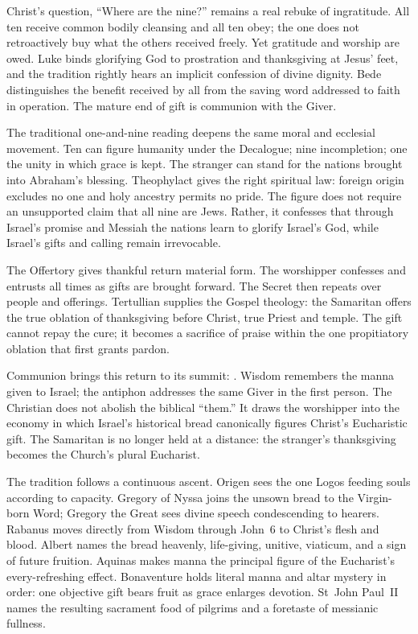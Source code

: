 Christ's question, ``Where are the nine?'' remains a real rebuke of
ingratitude. All ten receive common bodily cleansing and all ten obey; the one
does not retroactively buy what the others received freely. Yet gratitude and
worship are owed. Luke binds glorifying God to prostration and thanksgiving at
Jesus' feet, and the tradition rightly hears an implicit confession of divine
dignity. Bede distinguishes the benefit received by all from the saving word
addressed to faith in operation. The mature end of gift is communion with the
Giver.

The traditional one-and-nine reading deepens the same moral and ecclesial
movement. Ten can figure humanity under the Decalogue; nine incompletion; one
the unity in which grace is kept. The stranger can stand for the nations
brought into Abraham's blessing. Theophylact gives the right spiritual law:
foreign origin excludes no one and holy ancestry permits no pride. The figure
does not require an unsupported claim that all nine are Jews. Rather, it
confesses that through Israel's promise and Messiah the nations learn to
glorify Israel's God, while Israel's gifts and calling remain irrevocable.

The Offertory gives thankful return material form. The worshipper confesses
 and entrusts all times as gifts are brought forward.
The Secret then repeats  over people and offerings. Tertullian
supplies the Gospel theology: the Samaritan offers the true oblation of
thanksgiving before Christ, true Priest and temple. The gift cannot repay the
cure; it becomes a sacrifice of praise within the one propitiatory oblation
that first grants pardon.

Communion brings this return to its summit: . Wisdom remembers the manna given to Israel; the antiphon addresses the
same Giver in the first person. The Christian  does not abolish
the biblical ``them.'' It draws the worshipper into the economy in which
Israel's historical bread canonically figures Christ's Eucharistic gift. The
Samaritan is no longer held at a distance: the stranger's thanksgiving becomes
the Church's plural Eucharist.

The tradition follows a continuous ascent. Origen sees the one Logos feeding
souls according to capacity. Gregory of Nyssa joins the unsown bread to the
Virgin-born Word; Gregory the Great sees divine speech condescending to hearers.
Rabanus moves directly from Wisdom through John~6 to Christ's flesh and blood.
Albert names the bread heavenly, life-giving, unitive, viaticum, and a sign of
future fruition. Aquinas makes manna the principal figure of the Eucharist's
every-refreshing effect. Bonaventure holds literal manna and altar mystery in
order: one objective gift bears fruit as grace enlarges devotion. St~John
Paul~II names the resulting sacrament food of pilgrims and a foretaste of
messianic fullness.

